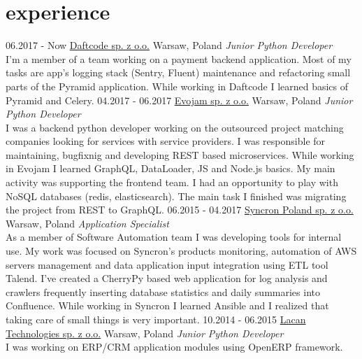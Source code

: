 \documentclass[]{friggeri-cv}
\begin{document}
\section{experience}

\begin{entrylist}
  \entry
    {06.2017 - Now}
    {\href{http://daftcode.pl/}{Daftcode sp. z o.o.}}
    {Warsaw, Poland}
    {\textit{Junior Python Developer}\\
    I'm a member of a team working on a payment backend application. Most of my tasks are app's logging stack (Sentry, Fluent) maintenance and refactoring small parts of the Pyramid application. While working in Daftcode I learned basics of Pyramid and Celery.}
  \entry
    {04.2017 - 06.2017}
    {\href{https://evojam.com/}{Evojam sp. z o.o.}}
    {Warsaw, Poland}
    {\textit{Junior Python Developer}\\
    I was a backend python developer working on the outsourced project matching companies looking for services with service providers. I was responsible for maintaining, bugfixnig and developing REST based microservices. While working in Evojam I learned GraphQL, DataLoader, JS and Node.js basics. My main activity was supporting the frontend team. I had an opportunity to play with NoSQL databases (redis, elasticsearch). The main task I finished was migrating the project from REST to GraphQL.}
  \entry
    {06.2015 - 04.2017}
    {\href{http://www.syncron.com/}{Syncron Poland sp. z o.o.}}
    {Warsaw, Poland}
    {\textit{Application Specialist}\\
    As a member of Software Automation team I was developing tools for internal use. My work was focused on Syncron's products monitoring, automation of AWS servers management and data application input integration using ETL tool Talend. I've created a CherryPy based web application for log analysis and crawlers frequently inserting database statistics and daily summaries into Confluence. While working in Syncron I learned Ansible and I realized that taking care of small things is very important.}
  \entry
    {10.2014 - 06.2015}
    {\href{http://www.lacan.com.pl/}{Lacan Technologies sp. z o.o.}}
    {Warsaw, Poland}
    {\textit{Junior Python Developer}\\
    I was working on ERP/CRM application modules using OpenERP framework.}

\end{entrylist}
\end{document}
